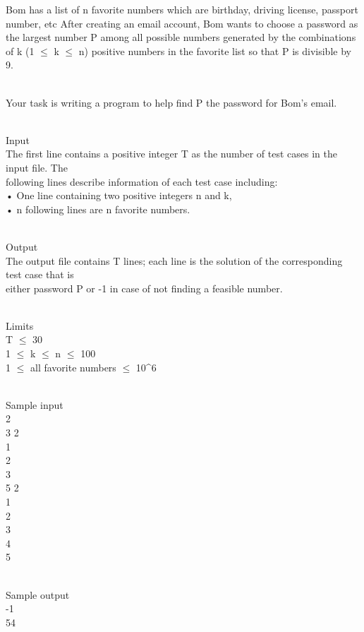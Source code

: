 



   Bom has a list of n favorite numbers which are birthday, driving license, passport number, etc After creating an email account, Bom wants to choose a password as the largest number P among all possible numbers generated by the combinations of k (1  $\le$  k  $\le$  n) positive numbers in the favorite list so that P is divisible by 9.  


\\   Your task is writing a program to help find P the password for Bom’s email.  


\\   Input   
\\   The first line contains a positive integer T as the number of test cases in the input file. The   
\\   following lines describe information of each test case including:   
\\   • One line containing two positive integers n and k,   
\\   • n following lines are n favorite numbers.  


\\   Output   
\\   The output file contains T lines; each line is the solution of the corresponding test case that is   
\\   either password P or -1 in case of not finding a feasible number.  


\\   Limits   
\\   T  $\le$  30   
\\   1  $\le$  k  $\le$  n  $\le$  100   
\\   1  $\le$  all favorite numbers  $\le$  10\textasciicircum6  


\\   Sample input   
\\   2   
\\   3 2   
\\   1   
\\   2   
\\   3   
\\   5 2   
\\   1   
\\   2   
\\   3   
\\   4   
\\   5  


\\   Sample output   
\\   -1   
\\   54  
